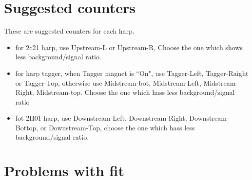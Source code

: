 \documentclass[letterpaper,12pt]{article}
\begin{document}
 \section{Suggested counters} \label{sec:suggested_counters}
 These are suggested counters for each harp.
 \begin{itemize}
  \item for 2c21 harp, use Upstream-L or Upstream-R, Choose the one which shows less background/signal ratio.
  \item for harp tagger, when Tagger magnet is ``On", use Tagger-Left, Tagger-Raight or Tagger-Top, otherwise use
  Midstream-bot, Midstream-Left, Midstream-Right, Midstream-top. Choose the one which hass less background/signal ratio
  \item fot 2H01 harp, use Downstream-Left, Downstream-Right, Downstream-Bottop, or Downstream-Top, choose the one which hass less background/signal ratio.
 \end{itemize}
 
 \section{Problems with fit}
 
 
\end{document}
